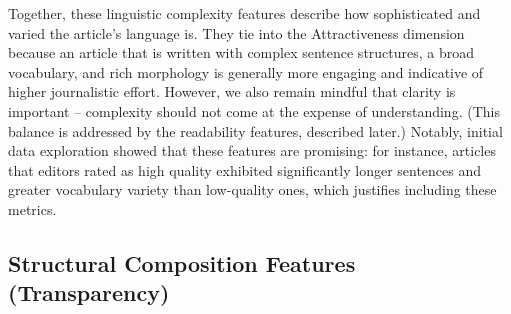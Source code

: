 Together, these linguistic complexity features describe how sophisticated and varied the article’s language is. They tie into the Attractiveness dimension because an article that is written with complex sentence structures, a broad vocabulary, and rich morphology is generally more engaging and indicative of higher journalistic effort. However, we also remain mindful that clarity is important – complexity should not come at the expense of understanding. (This balance is addressed by the readability features, described later.) Notably, initial data exploration showed that these features are promising: for instance, articles that editors rated as high quality exhibited significantly longer sentences and greater vocabulary variety than low-quality ones, which justifies including these metrics.

\subsection{Structural Composition Features (Transparency)}

